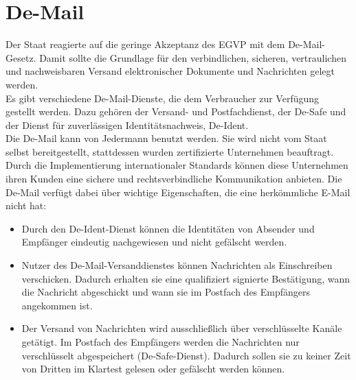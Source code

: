 \section{De-Mail}
Der Staat reagierte auf die geringe Akzeptanz des EGVP mit dem De-Mail-Gesetz.\textcite{bea:demailgesetz}  Damit sollte die Grundlage für den verbindlichen, sicheren, vertraulichen und nachweisbaren Versand elektronischer Dokumente und Nachrichten gelegt werden.\textcite{bea:demail}  \\
Es gibt verschiedene De-Mail-Dienste, die dem Verbraucher zur Verfügung gestellt werden. Dazu gehören der Versand- und Postfachdienst, der De-Safe und der Dienst für zuverlässigen Identitätsnachweis, De-Ident. \\
Die De-Mail kann von Jedermann benutzt werden. Sie wird nicht vom Staat selbst bereitgestellt, stattdessen wurden zertifizierte Unternehmen beauftragt. Durch die Implementierung internationaler Standards können diese Unternehmen ihren Kunden eine sichere und rechtsverbindliche Kommunikation anbieten. Die De-Mail verfügt dabei über wichtige Eigenschaften, die eine herkömmliche E-Mail nicht hat:
\begin{itemize}
	\item Durch den De-Ident-Dienst können die Identitäten von Absender und Empfänger eindeutig nachgewiesen und nicht gefälscht werden. 
	\item Nutzer des De-Mail-Versanddienstes können Nachrichten als Einschreiben verschicken. Dadurch erhalten sie eine qualifiziert signierte Bestätigung, wann die Nachricht abgeschickt und wann sie im Postfach des Empfängers angekommen ist.
	\item Der Versand von Nachrichten wird ausschließlich über verschlüsselte Kanäle getätigt. Im Postfach des Empfängers werden die Nachrichten nur verschlüsselt abgespeichert (De-Safe-Dienst). Dadurch sollen sie zu keiner Zeit von Dritten im Klartest gelesen oder gefälscht werden können.
\end{itemize}

